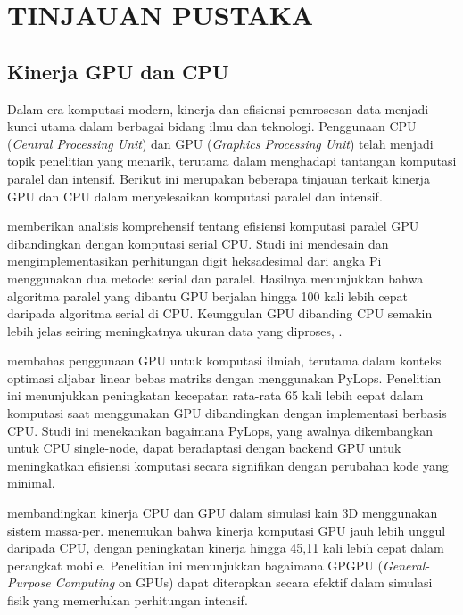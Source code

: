 \chapter{TINJAUAN PUSTAKA}
\label{tipus}


\section{Kinerja GPU dan CPU}

Dalam era komputasi modern, kinerja dan efisiensi pemrosesan data menjadi kunci
utama dalam berbagai bidang ilmu dan teknologi. Penggunaan CPU (\emph{Central
  Processing Unit}) dan GPU (\emph{Graphics Processing Unit}) telah menjadi topik
penelitian yang menarik, terutama dalam menghadapi tantangan komputasi paralel
dan intensif. Berikut ini merupakan beberapa tinjauan terkait kinerja GPU dan
CPU dalam menyelesaikan komputasi paralel dan intensif.

\cite{tjandraParallelNumericalComputation2022} memberikan analisis komprehensif
tentang efisiensi komputasi paralel GPU dibandingkan dengan komputasi serial CPU.
Studi ini mendesain dan mengimplementasikan perhitungan digit heksadesimal dari angka
Pi menggunakan dua metode: serial dan paralel. Hasilnya menunjukkan bahwa algoritma
paralel yang dibantu GPU berjalan hingga 100 kali lebih cepat daripada algoritma
serial di CPU. Keunggulan GPU dibanding CPU semakin lebih jelas seiring
meningkatnya ukuran data yang diproses, .

\cite{ravasiLeveragingGPUsMatrixfree2021} membahas penggunaan GPU untuk
komputasi ilmiah, terutama dalam konteks optimasi aljabar linear bebas matriks dengan
menggunakan PyLops. Penelitian ini menunjukkan peningkatan kecepatan rata-rata
65 kali lebih cepat dalam komputasi saat menggunakan GPU dibandingkan dengan
implementasi berbasis CPU. Studi ini menekankan bagaimana PyLops, yang awalnya
dikembangkan untuk CPU single-node, dapat beradaptasi dengan backend GPU untuk meningkatkan
efisiensi komputasi secara signifikan dengan perubahan kode yang minimal.

\cite{choiParallelClothSimulation2018} membandingkan kinerja CPU dan GPU dalam simulasi
kain 3D menggunakan sistem massa-per. \cite{choiParallelClothSimulation2018}
menemukan bahwa kinerja komputasi GPU jauh lebih unggul daripada CPU, dengan peningkatan
kinerja hingga 45,11 kali lebih cepat dalam perangkat mobile. Penelitian ini
menunjukkan bagaimana GPGPU (\emph{General-Purpose Computing} on GPUs) dapat diterapkan
secara efektif dalam simulasi fisik yang memerlukan perhitungan intensif.

